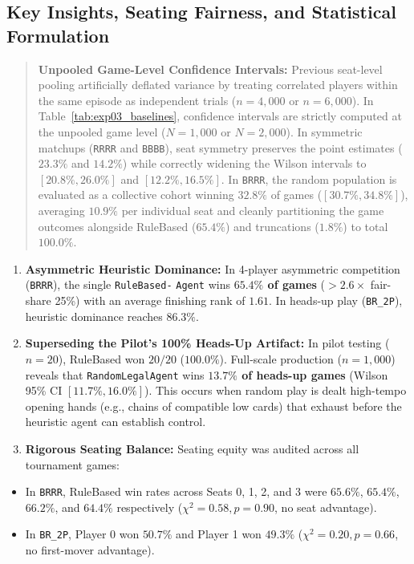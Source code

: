 \documentclass[11pt]{article}
\begin{document}
\subsection{Key Insights, Seating Fairness, and Statistical Formulation}
\begin{quote}
\small \textbf{Unpooled Game-Level Confidence Intervals:} Previous seat-level pooling artificially deflated variance by treating correlated players within the same episode as independent trials ($n=4{,}000$ or $n=6{,}000$). In Table~\ref{tab:exp03_baselines}, confidence intervals are strictly computed at the unpooled game level ($N=1{,}000$ or $N=2{,}000$). In symmetric matchups (\texttt{RRRR} and \texttt{BBBB}), seat symmetry preserves the point estimates ($23.3\%$ and $14.2\%$) while correctly widening the Wilson intervals to $[20.8\%, 26.0\%]$ and $[12.2\%, 16.5\%]$. In \texttt{BRRR}, the random population is evaluated as a collective cohort winning $32.8\%$ of games ($[30.7\%, 34.8\%]$), averaging $10.9\%$ per individual seat and cleanly partitioning the game outcomes alongside RuleBased ($65.4\%$) and truncations ($1.8\%$) to total $100.0\%$.
\end{quote}
\begin{enumerate}
  \item \textbf{Asymmetric Heuristic Dominance:} In 4-player asymmetric competition (\texttt{BRRR}), the single \mbox{\texttt{RuleBased-}} \texttt{Agent} wins \textbf{$65.4\%$ of games} ($>2.6\times$ fair-share 25\%) with an average finishing rank of $1.61$. In heads-up play (\texttt{BR\_2P}), heuristic dominance reaches \textbf{$86.3\%$}.
  \item \textbf{Superseding the Pilot's 100\% Heads-Up Artifact:} In pilot testing ($n=20$), RuleBased won $20/20$ ($100.0\%$). Full-scale production ($n=1,000$) reveals that \texttt{RandomLegalAgent} wins \textbf{$13.7\%$ of heads-up games} (Wilson 95\% CI $[11.7\%, 16.0\%]$). This occurs when random play is dealt high-tempo opening hands (e.g., chains of compatible low cards) that exhaust before the heuristic agent can establish control.
  \item \textbf{Rigorous Seating Balance:} Seating equity was audited across all tournament games:
\end{enumerate}
\begin{itemize}
  \item In \texttt{BRRR}, RuleBased win rates across Seats 0, 1, 2, and 3 were $65.6\%$, $65.4\%$, $66.2\%$, and $64.4\%$ respectively ($\chi^2 = 0.58, p = 0.90$, no seat advantage).
  \item In \texttt{BR\_2P}, Player 0 won $50.7\%$ and Player 1 won $49.3\%$ ($\chi^2 = 0.20, p = 0.66$, no first-mover advantage).
\end{itemize}
\end{document}
